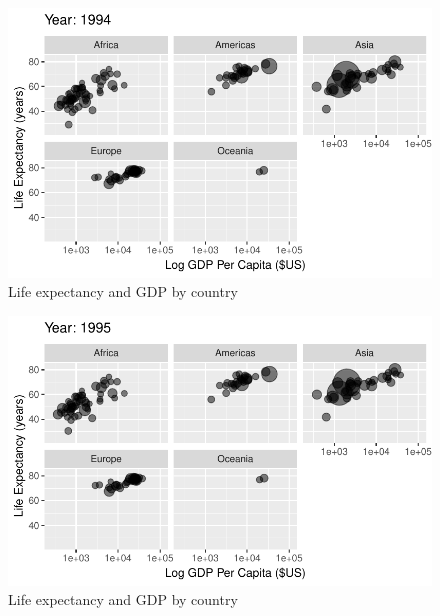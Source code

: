 \documentclass[
  letterpaper,
  DIV=11,
  numbers=noendperiod]{scrreport}
\theoremstyle{definition}
\theoremstyle{remark}
\begin{document}
\begin{figure}

{\centering \includegraphics{index_files/figure-pdf/fig-anim-lifegdp-77.pdf}

}

\caption{\label{fig-anim-lifegdp-77}Life expectancy and GDP by country}

\end{figure}

\begin{figure}

{\centering \includegraphics{index_files/figure-pdf/fig-anim-lifegdp-78.pdf}

}

\caption{\label{fig-anim-lifegdp-78}Life expectancy and GDP by country}

\end{figure}
\end{document}
